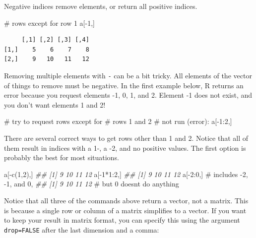 \documentclass[
  13,
  letterpaper,
]{report}
\newenvironment{Shaded}{\begin{snugshade}}{\end{snugshade}}
\newcommand{\CommentTok}[1]{\textcolor[rgb]{0.37,0.37,0.37}{#1}}
\newcommand{\DecValTok}[1]{\textcolor[rgb]{0.68,0.00,0.00}{#1}}
\newcommand{\DocumentationTok}[1]{\textcolor[rgb]{0.37,0.37,0.37}{\textit{#1}}}
\newcommand{\FunctionTok}[1]{\textcolor[rgb]{0.28,0.35,0.67}{#1}}
\newcommand{\NormalTok}[1]{\textcolor[rgb]{0.00,0.23,0.31}{#1}}
\newcommand{\SpecialCharTok}[1]{\textcolor[rgb]{0.37,0.37,0.37}{#1}}
\begin{document}
Negative indices remove elements, or return all positive indices.

\begin{Shaded}
\begin{Highlighting}[]
\CommentTok{\# rows except for row 1}
\NormalTok{a[}\SpecialCharTok{{-}}\DecValTok{1}\NormalTok{,]}
\end{Highlighting}
\end{Shaded}

\begin{verbatim}
     [,1] [,2] [,3] [,4]
[1,]    5    6    7    8
[2,]    9   10   11   12
\end{verbatim}

Removing multiple elements with \texttt{-} can be a bit tricky. All
elements of the vector of things to remove must be negative. In the
first example below, R returns an error because you request elements -1,
0, 1, and 2. Element -1 does not exist, and you don't want elements 1
and 2!

\begin{Shaded}
\begin{Highlighting}[]
\CommentTok{\# try to request rows except for}
\CommentTok{\# rows 1 and 2}
\CommentTok{\# not run (error):}
\NormalTok{a[}\SpecialCharTok{{-}}\DecValTok{1}\SpecialCharTok{:}\DecValTok{2}\NormalTok{,]}
\end{Highlighting}
\end{Shaded}

There are several correct ways to get rows other than 1 and 2. Notice
that all of them result in indices with a 1-, a -2, and no positive
values. The first option is probably the best for most situations.

\begin{Shaded}
\begin{Highlighting}[]
\NormalTok{a[}\SpecialCharTok{{-}}\FunctionTok{c}\NormalTok{(}\DecValTok{1}\NormalTok{,}\DecValTok{2}\NormalTok{),]}
\DocumentationTok{\#\# [1]  9 10 11 12}
\NormalTok{a[}\SpecialCharTok{{-}}\DecValTok{1}\SpecialCharTok{*}\DecValTok{1}\SpecialCharTok{:}\DecValTok{2}\NormalTok{,]}
\DocumentationTok{\#\# [1]  9 10 11 12}
\NormalTok{a[}\SpecialCharTok{{-}}\DecValTok{2}\SpecialCharTok{:}\DecValTok{0}\NormalTok{,] }\CommentTok{\# includes {-}2, {-}1, and 0,}
\DocumentationTok{\#\# [1]  9 10 11 12}
         \CommentTok{\# but 0 doesn\textquotesingle{}t do anything}
\end{Highlighting}
\end{Shaded}

Notice that all three of the commands above return a vector, not a
matrix. This is because a single row or column of a matrix simplifies to
a vector. If you want to keep your result in matrix format, you can
specify this using the argument \texttt{drop=FALSE} after the last
dimension and a comma:
\end{document}
